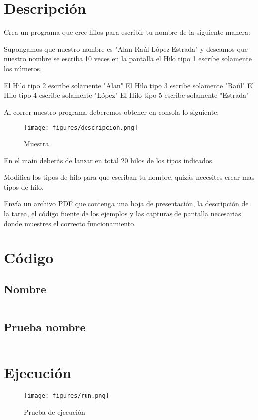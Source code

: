\documentclass[12pt]{article}
\author{Pablo Vargas Bermúdez}
\begin{document}
\pagestyle{empty}



\section*{Descripción}
Crea un programa que cree hilos para escribir tu nombre de la
siguiente manera:

Supongamos que nuestro nombre es "Alan Raúl López Estrada" y deseamos
que nuestro nombre se escriba 10 veces en la pantalla el Hilo tipo 1
escribe solamente los números,

El Hilo tipo 2 escribe solamente "Alan"
El Hilo tipo 3 escribe solamente "Raúl"
El Hilo tipo 4 escribe solamente "López"
El Hilo tipo 5 escribe solamente "Estrada"

Al correr nuestro programa deberemos obtener en consola lo siguiente:

\begin{figure}[H]
  \centering
  \texttt{[image: figures/descripcion.png]}
  \caption{Muestra}
\end{figure}


En el main deberás de lanzar en total 20 hilos de los tipos indicados.

Modifica los tipos de hilo para que escriban tu nombre, quizás
necesites crear mas tipos de hilo.

Envía un archivo PDF que contenga una hoja de presentación, la
descripción de la tarea, el código fuente de los ejemplos y las
capturas de pantalla necesarias donde muestres el correcto
funcionamiento.

\section*{Código}

\subsection*{Nombre}
\inputminted{Java}{Nombre.java}
\subsection*{Prueba nombre}
\inputminted{Java}{PruebaNombre.java}

\section*{Ejecución}

\begin{figure}[H]
  \centering
  \texttt{[image: figures/run.png]}
  \caption{Prueba de ejecución}
\end{figure}
\end{document}
